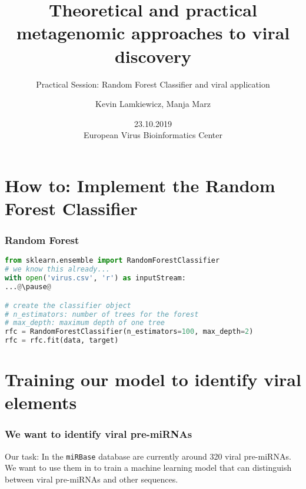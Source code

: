 

\title{Theoretical and practical metagenomic approaches to viral discovery}
\subtitle{Practical Session: Random Forest Classifier and viral application}
\author{Kevin Lamkiewicz, Manja Marz}
\date{23.10.2019\\[1em]European Virus Bioinformatics Center}



\begin{frame}
  \maketitle
\end{frame}

\section[Implementation]{How to: Implement the Random Forest Classifier}

\begin{frame}[c,fragile]\frametitle{Random Forest}
  \begin{lstlisting}[language=Python]
from sklearn.ensemble import RandomForestClassifier
# we know this already...
with open('virus.csv', 'r') as inputStream: 
...@\pause@

# create the classifier object
# n_estimators: number of trees for the forest
# max_depth: maximum depth of one tree
rfc = RandomForestClassifier(n_estimators=100, max_depth=2)
rfc = rfc.fit(data, target)
  \end{lstlisting}
\end{frame}


\section[Hands-On]{Training our model to identify viral elements}

\begin{frame}[c]\frametitle{We want to identify viral pre-miRNAs}
  \begin{block}{Our task:}
    In the \texttt{miRBase} database are currently around 320 viral pre-miRNAs.
    We want to use them in to train a machine learning model that can distinguish between
    viral pre-miRNAs and other sequences.
  \end{block}
  \vspace*{3em}
\end{frame}

